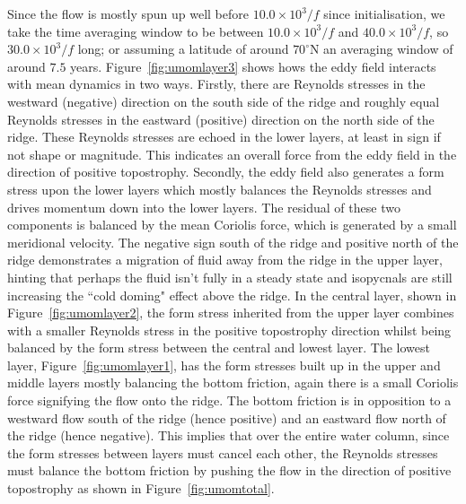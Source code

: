 \documentclass[12pt,a4paper]{report}
\newcommand*\figref[1]{Figure~\ref{#1}}
\begin{document}
 Since the flow is mostly spun up well before $10.0\times10^{3}/f$ since initialisation, we take the time averaging window to be between $10.0\times10^{3}/f$ and $40.0\times10^{3}/f$, so $30.0\times10^{3}/f$ long; or assuming a latitude of around  $70^{\circ}\mathrm{N}$ an
 averaging window of around $7.5$ years. 
 \figref{fig:umomlayer3} shows hows the eddy field interacts with mean dynamics 
 in two ways. Firstly, there are Reynolds stresses in the westward (negative) direction
 on the south side of the ridge and roughly equal Reynolds stresses in the eastward (positive) direction on the north side of the ridge. These Reynolds
 stresses are echoed in the lower layers, at least in sign if not shape or magnitude.
 This indicates an overall force from the eddy field in the direction of 
 positive topostrophy. Secondly, the eddy field also generates a form stress
 upon the lower layers which mostly balances the Reynolds stresses and drives
 momentum down into the lower layers. The residual of these two components is balanced
 by the mean Coriolis force, which is generated by a small meridional velocity.
 The negative sign south of the ridge and positive north of the ridge demonstrates
 a migration of fluid away from the ridge in the upper layer, hinting that perhaps
 the fluid isn't fully in a steady state and isopycnals are still increasing the 
 ``cold doming" effect above the ridge. In the central layer, shown in
 \figref{fig:umomlayer2}, the form stress inherited
 from the upper layer combines with a smaller Reynolds stress in the positive topostrophy
 direction whilst being balanced by the form stress between the central and lowest layer.
 The lowest layer, \figref{fig:umomlayer1}, has the form stresses built up in the 
 upper and middle layers mostly balancing the bottom friction, again
 there is a small Coriolis force signifying the flow onto the ridge. The bottom friction is 
 in opposition to a westward flow south of the ridge (hence positive) and an eastward
 flow north of the ridge (hence negative). This implies that over the entire
 water column, since the form stresses between layers must cancel each other, the 
 Reynolds stresses must balance the bottom friction by pushing the flow in the direction 
 of positive topostrophy as shown in \figref{fig:umomtotal}.
 
 
 
\end{document}
